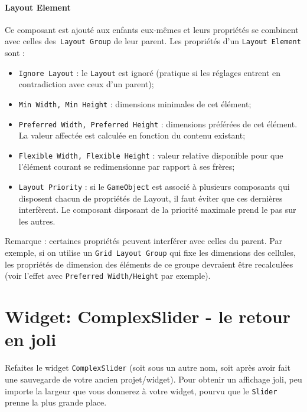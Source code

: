 \documentclass[a4paper,10pt]{article}
\newenvironment{solution}%
{\begin{tcolorbox}[breakable,colback=red!5!white,colframe=red!75!black,title=Solution]}%
{\end{tcolorbox}}
\begin{document}
\begin{enumerate}
	
\ifversionenseignant
\begin{solution}
	\paragraph{Layout Element}
	
Ce composant est ajouté aux enfants eux-mêmes et leurs propriétés se combinent avec celles des\texttt{ Layout Group} de leur parent. Les propriétés d'un \texttt{Layout Element} sont : 
\begin{itemize}
	\item \texttt{Ignore Layout} : le \texttt{Layout} est ignoré (pratique si les réglages entrent en contradiction avec ceux d'un parent);
	\item \texttt{Min Width, Min Height} : dimensions minimales de cet élément;
	\item \texttt{Preferred Width, Preferred Height} : dimensions préférées de cet élément. La valeur affectée est calculée en fonction du contenu existant;
	\item \texttt{Flexible Width, Flexible Height} : valeur relative disponible pour que l'élément courant se redimensionne par rapport à ses frères;
	\item  \texttt{Layout Priority} : si le \texttt{GameObject} est associé à plusieurs composants qui disposent chacun de propriétés de Layout, il faut éviter que ces dernières interfèrent. Le composant disposant de la priorité maximale prend le pas sur les autres.	
\end{itemize}

Remarque : certaines propriétés peuvent interférer avec celles du parent. Par exemple, si on utilise un \texttt{Grid Layout Group} qui fixe les dimensions des cellules, les propriétés de dimension des éléments de ce groupe devraient être recalculées (voir l'effet avec \texttt{Preferred Width/Height} par exemple).	
\end{solution}
\fi 

	
	
\end{enumerate}

\section{Widget: ComplexSlider - le retour en joli}

Refaites le widget \texttt{ComplexSlider} (soit sous un autre nom, soit après avoir fait une sauvegarde de votre ancien projet/widget). Pour obtenir un affichage joli, peu importe la largeur que vous donnerez à votre widget, pourvu que le \texttt{Slider} prenne la plus grande place.
\end{document}
